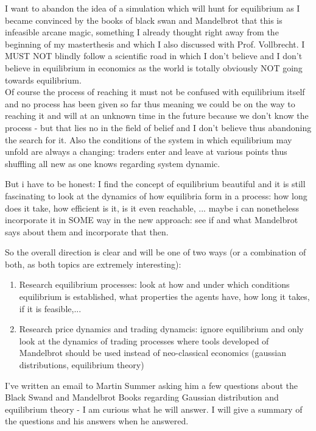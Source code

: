 \bigskip

I want to abandon the idea of a simulation which will hunt for equilibrium as I became convinced by the books of black swan and Mandelbrot that this is infeasible arcane magic, something I already thought right away from the beginning of my masterthesis and which I also discussed with Prof. Vollbrecht. I MUST NOT blindly follow a scientific road in which I don't believe and I don't believe in equilibrium in economics as the world is totally obviously NOT going towards equilibrium. \\
Of course the process of reaching it must not be confused with equilibrium itself and no process has been given so far thus meaning we could be on the way to reaching it and will at an unknown time in the future because we don't know the process - but that lies no in the field of belief and I don't believe thus abandoning the search for it. Also the conditions of the system in which equilibrium may unfold are always a changing: traders enter and leave at various points thus shuffling all new as one knows regarding system dynamic. \medskip

But i have to be honest: I find the concept of equilibrium beautiful and it is still fascinating to look at the dynamics of how equilibria form in a process: how long does it take, how efficient is it, is it even reachable, ... maybe i can nonetheless incorporate it in SOME way in the new approach: see if and what Mandelbrot says about them and incorporate that then.

\bigskip

So the overall direction is clear and will be one of two ways (or a combination of both, as both topics are extremely interesting):

\begin{enumerate}
\item Research equilibrium processes: look at how and under which conditions equilibrium is established, what properties the agents have, how long it takes, if it is feasible,...
\item Research price dynamics and trading dynamcis: ignore equilibrium and only look at the dynamics of trading processes where tools developed of Mandelbrot should be used instead of neo-classical economics (gaussian distributions, equilibrium theory)
\end{enumerate}

\bigskip

I've written an email to Martin Summer asking him a few questions about the Black Swand and Mandelbrot Books regarding Gaussian distribution and equilibrium theory - I am curious what he will answer. I will give a summary of the questions and his answers when he answered.

